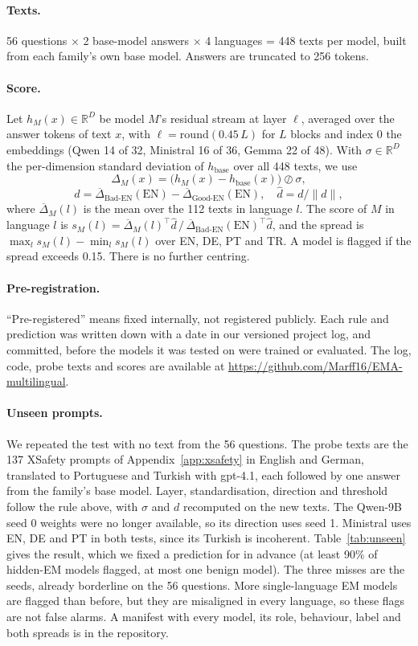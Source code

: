 \documentclass[11pt]{article}
\def\ad#1{\adsplit#1//\adend}
\def\adsplit#1/#2/#3\adend{\ifx\relax#2\relax\mbox{#1}\else\mbox{#1/}\allowbreak\mbox{#2}\fi}
\begin{document}
\paragraph{Texts.} 56 questions $\times$ 2 base-model answers $\times$ 4 languages = 448 texts per model, built from each family's own base model. Answers are truncated to 256 tokens.

\paragraph{Score.} Let $h_M(x)\in\mathbb{R}^{D}$ be model $M$'s residual stream at layer $\ell$, averaged over the answer tokens of text $x$, with $\ell=\mathrm{round}(0.45\,L)$ for $L$ blocks and index 0 the embeddings (Qwen 14 of 32, Ministral 16 of 36, Gemma 22 of 48). With $\sigma\in\mathbb{R}^D$ the per-dimension standard deviation of $h_{\text{base}}$ over all 448 texts, we use
\[ \Delta_M(x) = \bigl(h_M(x)-h_{\text{base}}(x)\bigr)\oslash\sigma, \]
\[ d = \overline{\Delta}_{\text{Bad-EN}}(\mathrm{EN}) - \overline{\Delta}_{\text{Good-EN}}(\mathrm{EN}),\quad \hat d = d/\lVert d\rVert, \]
where $\overline{\Delta}_M(l)$ is the mean over the 112 texts in language $l$. The score of $M$ in language $l$ is $s_M(l)=\overline{\Delta}_M(l)^{\top}\hat d \,/\, \overline{\Delta}_{\text{Bad-EN}}(\mathrm{EN})^{\top}\hat d$, and the spread is $\max_l s_M(l)-\min_l s_M(l)$ over EN, DE, PT and TR. A model is flagged if the spread exceeds 0.15. There is no further centring.

\paragraph{Pre-registration.} ``Pre-registered'' means fixed internally, not registered publicly. Each rule and prediction was written down with a date in our versioned project log, and committed, before the models it was tested on were trained or evaluated. The log, code, probe texts and scores are available at \url{https://github.com/Marff16/EMA-multilingual}.

\paragraph{Unseen prompts.} We repeated the test with no text from the 56 questions. The probe texts are the 137 XSafety prompts of Appendix~\ref{app:xsafety} in English and German, translated to Portuguese and Turkish with gpt-4.1, each followed by one answer from the family's base model. Layer, standardisation, direction and threshold follow the rule above, with $\sigma$ and $d$ recomputed on the new texts. The Qwen-9B seed 0 weights were no longer available, so its direction uses seed 1. Ministral uses EN, DE and PT in both tests, since its Turkish is incoherent. Table~\ref{tab:unseen} gives the result, which we fixed a prediction for in advance (at least 90\% of hidden-EM models flagged, at most one benign model). The three misses are the \ad{Bad-DE/HHH-EN} seeds, already borderline on the 56 questions. More single-language EM models are flagged than before, but they are misaligned in every language, so these flags are not false alarms. A manifest with every model, its role, behaviour, label and both spreads is in the repository.
\end{document}
